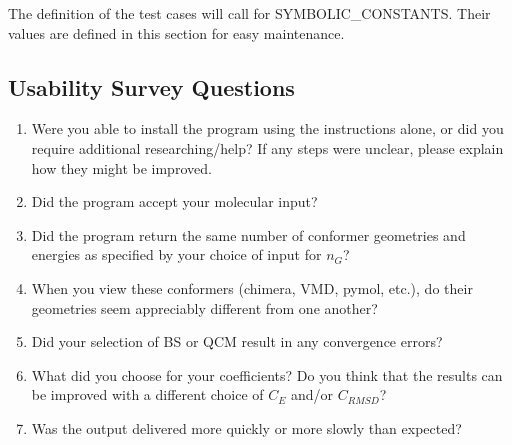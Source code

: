 \documentclass[12pt, titlepage]{article}
\begin{document}
The definition of the test cases will call for SYMBOLIC\_CONSTANTS.
Their values are defined in this section for easy maintenance.

\subsection{Usability Survey Questions} \label{survey}


\begin{enumerate}
	\item Were you able to install the program using the instructions alone, or 
	did you require additional researching/help? If any steps were unclear, 
	please explain how they might be improved.
	\item Did the program accept your molecular input?
	\item Did the program return the same number of conformer geometries and 
	energies as specified by your choice of input for $n_G$?
	\item When you view these conformers (chimera, VMD, pymol, etc.), do their 
	geometries seem appreciably different from one another?
	\item Did your selection of BS or QCM  result in any convergence errors?
	\item What did you choose for your coefficients? Do you think that the 
	results can be improved with a different choice of $C_E$ and/or $C_{RMSD}$?
	\item Was the output delivered more quickly or more slowly than expected?
	
\end{enumerate}
\end{document}
